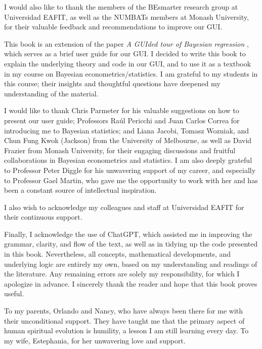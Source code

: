I would also like to thank the members of the BEsmarter research group at Universidad EAFIT, as well as the NUMBATs members at Monash University, for their valuable feedback and recommendations to improve our GUI.

This book is an extension of the paper \textit{A GUIded tour of Bayesian regression} \cite{Ramirez2020}, which serves as a brief user guide for our GUI. I decided to write this book to explain the underlying theory and code in our GUI, and to use it as a textbook in my course on Bayesian econometrics/statistics. I am grateful to my students in this course; their insights and thoughtful questions have deepened my understanding of the material.

I would like to thank Chris Parmeter for his valuable suggestions on how to present our user guide; Professors Raúl Pericchi and Juan Carlos Correa for introducing me to Bayesian statistics; and Liana Jacobi, Tomasz Wozniak, and Chun Fung Kwok (Jackson) from the University of Melbourne, as well as David Frazier from Monash University, for their engaging discussions and fruitful collaborations in Bayesian econometrics and statistics. I am also deeply grateful to Professor Peter Diggle for his unwavering support of my career, and especially to Professor Gael Martin, who gave me the opportunity to work with her and has been a constant source of intellectual inspiration.  

I also wish to acknowledge my colleagues and staff at Universidad EAFIT for their continuous support.  

Finally, I acknowledge the use of ChatGPT, which assisted me in improving the grammar, clarity, and flow of the text, as well as in tidying up the code presented in this book. Nevertheless, all concepts, mathematical developments, and underlying logic are entirely my own, based on my understanding and readings of the literature. Any remaining errors are solely my responsibility, for which I apologize in advance. I sincerely thank the reader and hope that this book proves useful.  

To my parents, Orlando and Nancy, who have always been there for me with their unconditional support. They have taught me that the primary aspect of human spiritual evolution is humility, a lesson I am still learning every day. To my wife, Estephania, for her unwavering love and support.




